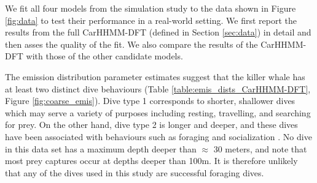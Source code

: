 



We fit all four models from the simulation study to the data shown in Figure \ref{fig:data} to test their performance in a real-world setting. We first report the results from the full CarHHMM-DFT (defined in Section \ref{sec:data}) in detail and then asses the quality of the fit. We also compare the results of the CarHHMM-DFT with those of the other candidate models.

The emission distribution parameter estimates suggest that the killer whale has at least two distinct dive behaviours (Table \ref{table:emis_dists_CarHHMM-DFT}, Figure \ref{fig:coarse_emis}). 
Dive type 1 corresponds to shorter, shallower dives which may serve a variety of purposes including resting, travelling, and searching for prey.
On the other hand, dive type 2 is longer and deeper, and these dives have been associated with behaviours such as foraging and socialization \citep{Tennessen:2019b}. No dive in this data set has a maximum depth deeper than $\approx$ 30 meters, and \citet{Wright:2017} note that most prey captures occur at depths deeper than 100m. It is therefore unlikely that any of the dives used in this study are successful foraging dives.

